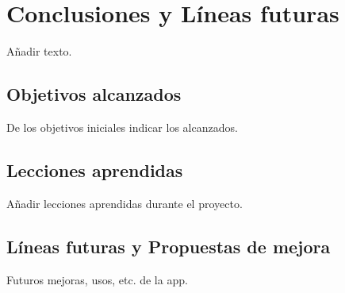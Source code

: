 
\pagestyle{fancy}

\chapter{Conclusiones y Líneas futuras}
\label{conclusiones}

Añadir texto.

\section{Objetivos alcanzados}

De los objetivos iniciales indicar los alcanzados.\\

\section{Lecciones aprendidas}

Añadir lecciones aprendidas durante el proyecto.\\

\section{Líneas futuras y Propuestas de mejora}

Futuros mejoras, usos, etc. de la app.\\
